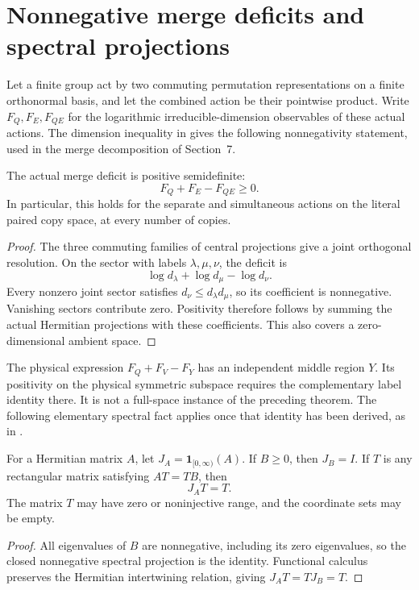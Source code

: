\section{Nonnegative merge deficits and spectral projections}
\label{sec:merge-deficit-positivity}

Let a finite group act by two commuting permutation representations on a
finite orthonormal basis, and let the combined action be their pointwise
product. Write $F_Q,F_E,F_{QE}$ for the logarithmic irreducible-dimension
observables of these actual actions. The dimension inequality in
\cite[Section~5, Lemma~6.1(3)]{OpenAI2026AreaLaw} gives the following
nonnegativity statement, used in the merge decomposition of Section~7.

\begin{theorem}
\label{thm:merge-deficit-positivity}
\leanok
The actual merge deficit is positive semidefinite:
\[
 F_Q+F_E-F_{QE}\ge0.
\]
In particular, this holds for the separate and simultaneous actions on the
literal paired copy space, at every number of copies.
\end{theorem}

\begin{proof}
\leanok
The three commuting families of central projections give a joint orthogonal
resolution. On the sector with labels $\lambda,\mu,\nu$, the deficit is
\[
 \log d_\lambda+\log d_\mu-\log d_\nu.
\]
Every nonzero joint sector satisfies $d_\nu\le d_\lambda d_\mu$, so its
coefficient is nonnegative. Vanishing sectors contribute zero. Positivity
therefore follows by summing the actual Hermitian projections with these
coefficients. This also covers a zero-dimensional ambient space.
\end{proof}

The physical expression $F_Q+F_V-F_Y$ has an independent middle region $Y$.
Its positivity on the physical symmetric subspace requires the complementary
label identity there. It is not a full-space instance of the preceding theorem.
The following elementary spectral fact applies once that identity has been
derived, as in \cite[Section~7, lines~515--522]{OpenAI2026AreaLaw}.

\begin{theorem}
\label{thm:nonnegative-spectral-intertwiner}
\leanok
For a Hermitian matrix $A$, let $J_A=\mathbf1_{[0,\infty)}(A)$.
If $B\ge0$, then $J_B=I$. If $T$ is any rectangular matrix satisfying
$AT=TB$, then
\[
 J_AT=T.
\]
The matrix $T$ may have zero or noninjective range, and the coordinate sets
may be empty.
\end{theorem}

\begin{proof}
\leanok
All eigenvalues of $B$ are nonnegative, including its zero eigenvalues, so
the closed nonnegative spectral projection is the identity. Functional
calculus preserves the Hermitian intertwining relation, giving
$J_AT=TJ_B=T$.
\end{proof}
